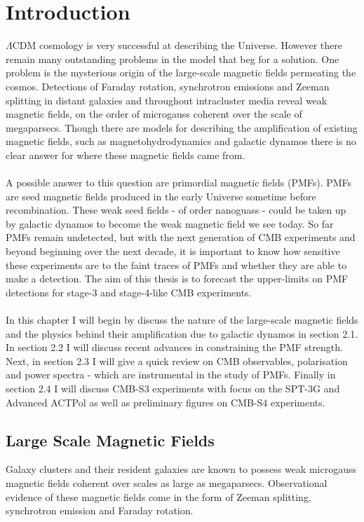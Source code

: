 \section{Introduction}

$\Lambda$CDM cosmology is very successful at describing the Universe. However there remain many outstanding problems in the model that beg for a solution. One problem is the mysterious origin of the large-scale magnetic fields permeating the cosmos. Detections of Faraday rotation, synchrotron emissions and Zeeman splitting in distant galaxies and throughout intracluster media reveal weak magnetic fields, on the order of microgauss coherent over the scale of megaparsecs. Though there are models for describing the amplification of existing magnetic fields, such as magnetohydrodynamics and galactic dynamos there is no clear answer for where these magnetic fields came from.
\\\\
A possible answer to this question are primordial magnetic fields (PMFs). PMFs are seed magnetic fields produced in the early Universe sometime before recombination. These weak seed fields - of order nanoguass - could be taken up by galactic dynamos to become the weak magnetic field we see today. So far PMFs remain undetected, but with the next generation of CMB experiments and beyond beginning over the next decade, it is important to know how sensitive these experiments are to the faint traces of PMFs and whether they are able to make a detection.
The aim of this thesis is to forecast the upper-limits on PMF detections for stage-3 and stage-4-like CMB experiments.
\\\\
In this chapter I will begin by discuss the nature of the large-scale magnetic fields and the physics behind their amplification due to galactic dynamos in section 2.1. In section 2.2 I will discuss recent advances in constraining the PMF strength. Next, in section 2.3 I will give a quick review on CMB observables, polarisation and power spectra - which are instrumental in the study of PMFs. Finally in section 2.4 I will discuss CMB-S3 experiments with focus on the SPT-3G and Advanced ACTPol as well as preliminary figures on CMB-S4 experiments.

\subsection{Large Scale Magnetic Fields}

Galaxy clusters and their resident galaxies are known to possess weak microgauss magnetic fields coherent over scales as large as megaparsecs. Observational evidence of these magnetic fields come in the form of Zeeman splitting, synchrotron emission and Faraday rotation.

